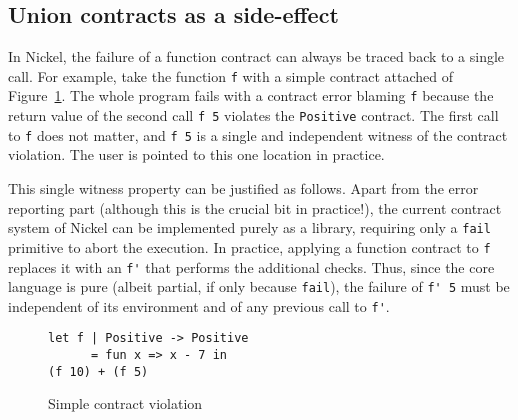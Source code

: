 \documentclass[sigplan,screen,10pt]{acmart}
\newcommand{\unsure}[2][1=]{}
\newcommand{\nickel}[1]{\lstinline[language=nickel]{#1}}
\begin{document}
\subsection{Union contracts as a side-effect}

In \unsure{Maybe specify its Nickel without Union or inter}Nickel,
the failure of a function contract can always be traced back to a
single call. For example, take the function \nickel{f} with a simple contract
attached of Figure~\ref{fig:pos-to-pos}. The whole program fails with a contract
error blaming \nickel{f} because the return value of the second call \nickel{f 5}
violates the \nickel{Positive} contract. The first call to \nickel{f} does
not matter, and \nickel{f 5} is a single and independent witness of the contract
violation. The user is pointed to this one location in practice.

This single witness property can be justified as follows. Apart from the error
reporting part (although this is the crucial bit in practice!), the current
contract system of Nickel can be implemented purely as a library, requiring only
a \nickel{fail} primitive to abort the execution. In practice, applying a
function contract to \nickel{f} replaces it with an \nickel{f'} that performs the
additional checks. Thus, since the core language is pure (albeit
partial, if only because \nickel{fail}), the failure of \nickel{f' 5}
must be independent of its environment and of any previous call to \nickel{f'}.

%

\begin{figure}[h]
\begin{lstlisting}[language=nickel]
let f | Positive -> Positive
      = fun x => x - 7 in
(f 10) + (f 5)
\end{lstlisting}
\caption{Simple contract violation}
\label{fig:pos-to-pos}
\end{figure}
\end{document}
